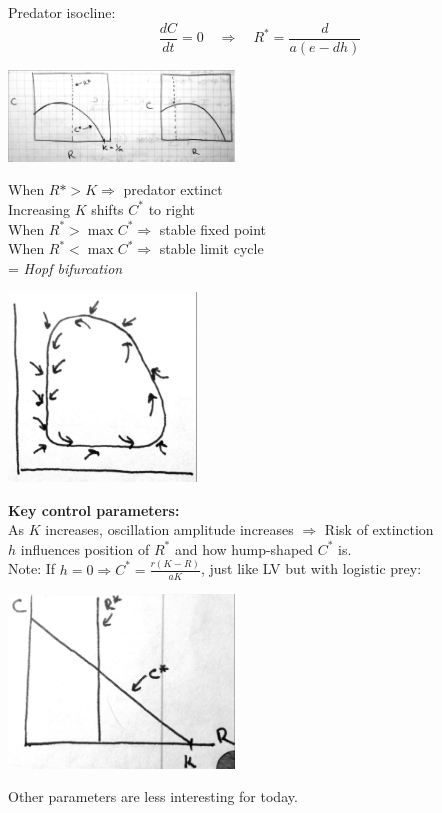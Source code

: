 \documentclass{article}
\newcommand{\ind}{\-\hspace{1cm}}
\begin{document}
Predator isocline:
\begin{equation*}
	\frac{dC}{dt}=0 \quad \Rightarrow \quad R^* = \frac{d}{a(e-dh)}
\end{equation*}
 \begin{center}
 	\includegraphics[width=6cm]{figs/MRiso.pdf}
 \end{center}

When $ R* > K \Rightarrow$ predator extinct\\
Increasing $K$ shifts $C^*$ to right\\
\ind When $R^*> \max C^* \Rightarrow$ stable fixed point\\
\ind When $R^*< \max C^* \Rightarrow$ stable limit cycle\\
\ind \ind = \emph{Hopf bifurcation}
\begin{center}
 	\includegraphics[width=5cm]{figs/LimitCycle.pdf}
\end{center}
\textbf{Key control parameters:}\\
As $K$ increases, oscillation amplitude increases $\Rightarrow$ Risk of extinction\\
$h$ influences position of $R^*$ and how hump-shaped $C^*$ is.\\

Note: If $h=0 \Rightarrow C^* = \frac{r(K-R)}{aK}$, just like LV but with logistic prey:
\begin{center}
 	\includegraphics[width=6cm]{figs/LVlog.pdf}
\end{center}
Other parameters are less interesting for today.
\end{document}
